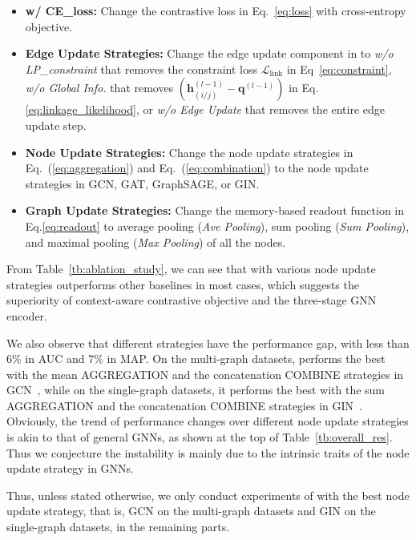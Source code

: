 \begin{itemize}[leftmargin=1em]
	\item \textbf{w/ CE\_loss:} Change the contrastive loss in Eq.~\eqref{eq:loss} with cross-entropy objective.
    \item \textbf{Edge Update Strategies:} Change the edge update component in  to \textit{w/o LP\_constraint} that removes the constraint loss $\mathcal{L}_{\text{link}}$ in Eq~\eqref{eq:constraint},  
	\textit{w/o Global Info.} that removes $(\boldsymbol{h}^{(l-1)}_{(i/j)} - \boldsymbol{q}^{(l-1)})$ in Eq.\eqref{eq:linkage_likelihood}, or \textit{w/o Edge Update} that removes the entire edge update step.
	\item \textbf{Node Update Strategies:} Change the node update strategies in Eq.~(\ref{eq:aggregation}) and Eq.~(\ref{eq:combination}) to the node update strategies in GCN, GAT, GraphSAGE, or GIN. 
	\item \textbf{Graph Update Strategies:} Change the memory-based readout function in Eq.\eqref{eq:readout} to average pooling (\textit{Ave Pooling}), sum pooling (\textit{Sum Pooling}), and maximal pooling (\textit{Max Pooling}) of all the nodes.
\end{itemize}



  From Table~\ref{tb:ablation_study}, we can see that 
\smodel with various node update strategies outperforms other baselines in most cases, which suggests the superiority of context-aware contrastive objective and the three-stage GNN encoder.

We also observe that different strategies have the performance gap, with less than 6\% in AUC and 7\% in MAP.  On the multi-graph datasets, \smodel performs the best with the mean AGGREGATION and the concatenation COMBINE strategies in GCN~\cite{kipf2016semi}, while on the single-graph datasets, it performs the best with the sum AGGREGATION and the concatenation COMBINE strategies in GIN~\cite{xu2018powerful}. Obviously, the trend of performance changes over different node update strategies is akin to that of general GNNs, as shown at the top of Table~\ref{tb:overall_res}. Thus we conjecture the instability is mainly due to the intrinsic traits of the node update strategy in GNNs. 

Thus, unless stated otherwise, we only conduct experiments of \smodel with the best node update strategy, that is, GCN on the multi-graph datasets and GIN on the single-graph datasets, in the remaining parts.





